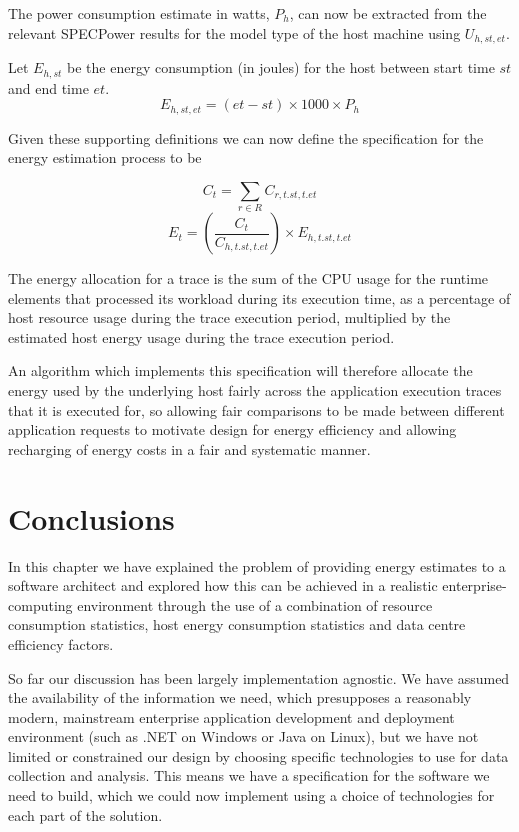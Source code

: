 The power consumption estimate in watts, $P_{h}$, can now be extracted from the relevant SPECPower results for the model type of the host machine using $U_{h,st,et}$.

Let $E_{h,st}$ be the energy consumption (in joules) for the host between start time $st$ and end time $et$.
\begin{equation}
E_{h,st,et} = (et - st) \times 1000 \times P_{h}
\end{equation}

Given these supporting definitions we can now define the specification for the energy estimation process to be

\begin{equation}
C_{t} = \sum_{r \in R} C_{r,t.st,t.et}
\end{equation}
\begin{equation}
E_{t} = \left( \frac {C_{t}} {C_{h,t.st,t.et}} \right) \times E_{h, t.st, t.et}
\end{equation}

The energy allocation for a trace is the sum of the CPU usage for the runtime elements that processed its workload during its execution time, as a percentage of host resource usage during the trace execution period, multiplied by the estimated host energy usage during the trace execution period.

An algorithm which implements this specification will therefore allocate the energy used by the underlying host fairly across the application execution traces that it is executed for, so allowing fair comparisons to be made between different application requests to motivate design for energy efficiency and allowing recharging of energy costs in a fair and systematic manner.

\section{Conclusions}

In this chapter we have explained the problem of providing energy estimates to a software architect and explored how this can be achieved in a realistic enterprise-computing environment through the use of a combination of resource consumption statistics, host energy consumption statistics and data centre efficiency factors.

So far our discussion has been largely implementation agnostic.  We have assumed the availability of the information we need, which presupposes a reasonably modern, mainstream enterprise application development and deployment environment (such as .NET on Windows or Java on Linux), but we have not limited or constrained our design by choosing specific technologies to use for data collection and analysis.  This means we have a specification for the software we need to build, which we could now implement using a choice of technologies for each part of the solution.

